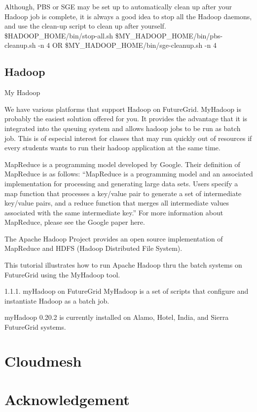 \documentclass{article}
\begin{document}
Although, PBS or SGE may be set up to automatically clean up after your Hadoop job is
complete, it is always a good idea to stop all the Hadoop daemons, and use the clean-up
script to clean up after yourself.
\$HADOOP\_HOME/bin/stop-all.sh
\$MY\_HADOOP\_HOME/bin/pbs-cleanup.sh -n 4 OR
\$MY\_HADOOP\_HOME/bin/sge-cleanup.sh -n 4


\subsection{Hadoop}

My Hadoop

We have various platforms that support Hadoop on FutureGrid. MyHadoop is probably the easiest solution offered for you. It provides the advantage that it is integrated into the queuing system and allows hadoop jobs to be run as batch job. This is of especial interest for classes that may run quickly out of resources if every students wants to run their hadoop application at the same time.



MapReduce is a programming model developed by Google. Their definition of MapReduce is as follows: “MapReduce is a programming model and an associated implementation for processing and generating large data sets. Users specify a map function that processes a key/value pair to generate a set of intermediate key/value pairs, and a reduce function that merges all intermediate values associated with the same intermediate key.” For more information about MapReduce, please see the Google paper here.

The Apache Hadoop Project provides an open source implementation of MapReduce and HDFS (Hadoop Distributed File System).

This tutorial illustrates how to run Apache Hadoop thru the batch systems on FutureGrid using the MyHadoop tool.

1.1.1. myHadoop on FutureGrid
MyHadoop is a set of scripts that configure and instantiate Hadoop as a batch job.

myHadoop 0.20.2 is currently installed on Alamo, Hotel, India, and Sierra FutureGrid systems.

\section{Cloudmesh}


\section*{Acknowledgement}
\end{document}
